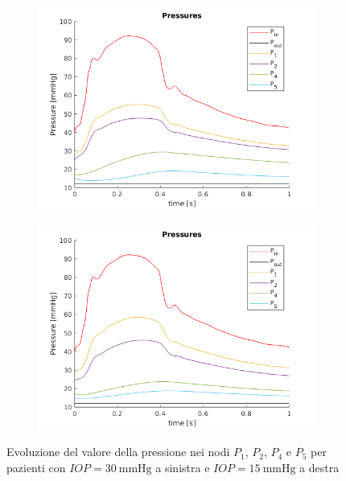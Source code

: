 \documentclass{article}
\begin{document}
\begin{figure}[h]
\begin{subfigure}{.5\textwidth}
  \centering
  \includegraphics[width=1.0\linewidth]{Pictures/IOP30_part1/pressures_30.png}
\end{subfigure}
\begin{subfigure}{.5\textwidth}
  \centering
  \includegraphics[width=1.0\linewidth]{Pictures/IOP15_part1/pressures_15.png}
\end{subfigure}
\caption{Evoluzione del valore della pressione nei nodi  $P_1$, $P_2$, $P_4$ e $P_5$ per pazienti con $IOP = \SI{30}{\mmHg}$ a sinistra e $IOP = \SI{15}{\mmHg}$ a destra}
\label{pressioni1530}
\end{figure}
\end{document}
